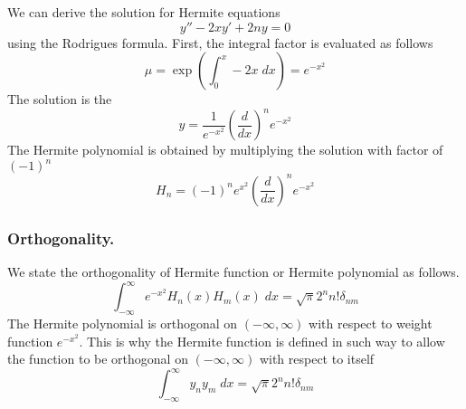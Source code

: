 \documentclass[../../../main.tex]{subfiles}
\begin{document}
We can derive the solution for Hermite equations
\begin{equation*}
    y''-2xy'+2ny=0
\end{equation*}
using the Rodrigues formula. First, the integral factor is evaluated as follows 
\begin{equation*}
    \mu=\exp\left(\int_{0}^{x}-2x\;dx\right)=e^{-x^2}
\end{equation*}
The solution is the 
\begin{equation*}
    y=\frac{1}{e^{-x^2}}\left(\frac{d}{dx}\right)^ne^{-x^2}
\end{equation*}
The Hermite polynomial is obtained by multiplying the solution with factor of $(-1)^n$
\begin{equation*}
    H_n=(-1)^ne^{x^2}\left(\frac{d}{dx}\right)^ne^{-x^2}
\end{equation*} 

\subsubsection{Orthogonality.} We state the orthogonality of Hermite function or Hermite polynomial as follows.
\begin{equation*}
    \int_{-\infty}^{\infty}e^{-x^2}H_n(x)H_m(x)\;dx=\sqrt{\pi}2^n n!\delta_{nm}
\end{equation*} 
The Hermite polynomial is orthogonal on $(-\infty,\infty)$ with respect to weight function $e^{-x^2}$. 
This is why the Hermite function is defined in such way to allow the function to be orthogonal on $(-\infty,\infty)$ with respect to itself
\begin{equation*}
    \int_{-\infty}^{\infty}y_ny_m\;dx=\sqrt{\pi}2^nn!\delta_{nm}
\end{equation*}
\end{document}
